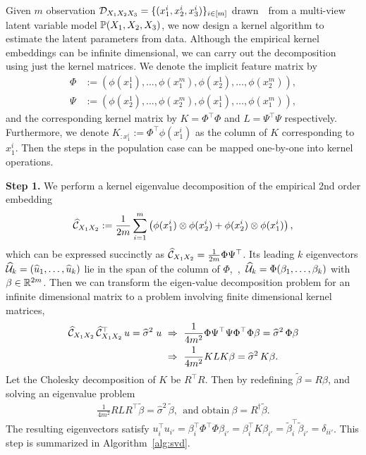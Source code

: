 \documentclass{article}
\begin{document}
Given $m$ observation $\mathcal{D}_{X_1 X_2 X_3}=\{(x_1^i,x_2^i,x_3^i)\}_{i \in [m]}$ drawn~\iid~from a multi-view latent variable model $\mathbb{P}(X_1,X_2,X_3)$, we now design a kernel algorithm to estimate the latent parameters from data. Although the empirical kernel embeddings can be infinite dimensional, we can carry out the decomposition using just the kernel matrices.
We  denote the implicit feature matrix by
\begin{align*}
  \Phi &:= (\phi(x_1^1), \ldots, \phi(x_1^m), \phi(x_2^1),  \ldots, \phi(x_2^m)),  \\
  \Psi &:= (\phi(x_2^1), \ldots, \phi(x_2^m), \phi(x_1^1),  \ldots, \phi(x_1^m)),
\end{align*}
and the corresponding kernel matrix by $K = \Phi^\top \Phi$ and $L = \Psi^\top \Psi$ respectively.
Furthermore, we denote $K_{:x_1^i}:=\Phi^\top \phi(x_1^i)$ as the column of $K$ corresponding to $x_1^i$.
Then the steps in the population case can be mapped one-by-one into kernel operations.

{\bf Step 1.} We  perform a kernel eigenvalue decomposition of the empirical 2nd order embedding
$$
  \widehat {\mathcal{C}}_{X_1 X_2}:= \frac{1}{2m} \sum_{i=1}^{m} \left(\phi(x_1^i) \otimes \phi(x_2^i) + \phi(x_2^i) \otimes \phi(x_1^i)\right),
$$
which can be expressed succinctly as $\widehat {\mathcal{C}}_{X_1 X_2} = \frac{1}{2m} \Phi \Psi^\top$.
Its leading $k$ eigenvectors $\widehat {\mathcal{U}}_k = (\widehat u_1,\ldots,\widehat u_k)$  lie in the span of the column of  $\Phi$,~\ie,~$\widehat {\mathcal{U}}_k = \Phi (\beta_1,\ldots,\beta_k)$ with $\beta \in \mathbb{R}^{2m}$. Then we can transform the eigen-value decomposition problem for an infinite dimensional matrix to a problem involving finite dimensional kernel matrices,
\begin{align*}
	\widehat {\mathcal{C}}_{X_1 X_2}\, \widehat {\mathcal{C}}_{X_1 X_2}^\top\, u = \widehat \sigma^2 \;u
	&~\Rightarrow~
	\frac{1}{4m^2}\Phi \Psi^\top \Psi \Phi^\top \Phi \beta = \widehat \sigma^2 \,\Phi \beta \\
	&~\Rightarrow~
	\frac{1}{4m^2} K L K \beta = \widehat \sigma^2 \,K \beta.
\end{align*}
Let the Cholesky decomposition of $K$ be $R^\top R$. Then by redefining $\widetilde{\beta}=R\beta$, and solving an eigenvalue problem
\begin{align}
 \frac{1}{4m^2} R L R^\top \widetilde{\beta} =\widehat  \sigma^2 \, \widetilde{\beta},~~\text{and obtain}~\beta = R^{\dagger} \widetilde{\beta}.
\end{align}
The resulting eigenvectors satisfy $u_i^\top u_{i'} = \beta_i^\top \Phi^\top \Phi \beta_{i'} =  \beta_{i}^\top K  \beta_{i'} =  \widetilde{\beta}_{i}^\top \widetilde{\beta}_{i'}=\delta_{ii'}$.
This step is summarized in Algorithm~\ref{alg:svd}.
\end{document}
